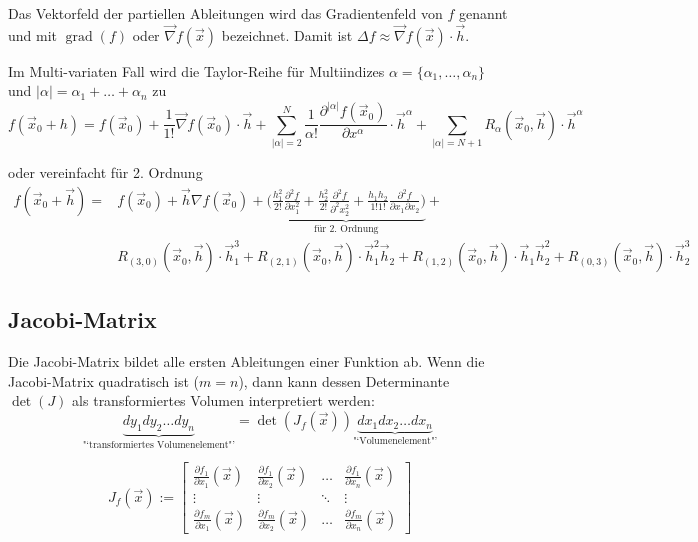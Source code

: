   Das Vektorfeld der partiellen Ableitungen wird das Gradientenfeld von $f$ genannt und mit $\operatorname{grad}(f)$ oder $\vec{\nabla} f(\vec{x})$ bezeichnet.
  Damit ist $\Delta f \approx \vec{\nabla} f(\vec{x}) \cdot \vec{h}$.

  Im Multi-variaten Fall wird die Taylor-Reihe für Multiindizes $\alpha = \{ \alpha_1, \hdots , \alpha_n \}$ und $|\alpha| = \alpha_1 + \hdots + \alpha_n $ zu
  \[
      f(\vec{x}_0+h) = f(\vec{x}_0) + \frac{1}{1!}\vec{\nabla}f(\vec{x}_0) \cdot \vec{h}
       + \sum\limits_{|\alpha|=2}^N \frac{1}{\alpha!}\frac{\partial^{|\alpha|} f(\vec{x}_0)}{\partial x^{\alpha}} \cdot \vec{h}^{\alpha}
       + \sum\limits_{|\alpha|=N+1} R_{\alpha}(\vec{x}_0,\vec{h}) \cdot \vec{h}^{\alpha}
  \]
  
  oder vereinfacht für 2. Ordnung
  \[
	  \begin{split}
      f(\vec{x}_0 + \vec{h}) = & f(\vec{x}_0) + \vec{h} \nabla f(\vec{x}_0) +
      \underbrace{\bigg( \frac{h_1^2}{2!} \frac{\partial^2 f}{\partial x_1^2} + \frac{h_2^2}{2!} \frac{\partial^2 f}{\partial^2 x_2^2}
      + \frac{h_1 h_2}{1!1!} \frac{\partial^2 f}{\partial x_1 \partial x_2}\bigg)}_{\text{für 2. Ordnung}} + \\
      & R_{(3,0)}(\vec{x}_0, \vec{h}) \cdot \vec{h}_1^3 + R_{(2,1)}(\vec{x}_0, \vec{h}) \cdot \vec{h}_1^2 \vec{h}_2 + R_{(1,2)}(\vec{x}_0, \vec{h}) \cdot \vec{h}_1 \vec{h}_2^2 + R_{(0,3)}(\vec{x}_0, \vec{h}) \cdot \vec{h}_2^3
      \end{split}
  \]
  
\subsection{Jacobi-Matrix}
  \begin{minipage}{12cm}
    Die Jacobi-Matrix bildet alle ersten Ableitungen einer Funktion ab.
    Wenn die Jacobi-Matrix quadratisch ist ($m=n$), dann kann dessen Determinante $\det(J)$ als 
    transformiertes Volumen interpretiert werden:
    \[
        \underbrace{dy_1 dy_2 \ldots dy_n}_{\text{"`transformiertes Volumenelement"'}} = 
        \det(J_f(\vec{x})) \underbrace{dx_1 dx_2 \ldots dx_n}_{\text{"`Volumenelement"'}}
    \]
  \end{minipage}
  \begin{minipage}{6cm}
    \[
        J_f(\vec{x}) :=  \begin{bmatrix}
        \frac{\partial f_1}{\partial x_1}(\vec{x}) & \frac{\partial f_1}{\partial x_2}(\vec{x}) & \ldots & \frac{\partial f_1}{\partial x_n}(\vec{x}) \\
        \vdots & \vdots & \ddots & \vdots \\
        \frac{\partial f_m}{\partial x_1}(\vec{x}) & \frac{\partial f_m}{\partial x_2}(\vec{x}) & \ldots & \frac{\partial f_m}{\partial x_n} (\vec{x})
        \end{bmatrix}
    \]
  \end{minipage} \\
  
